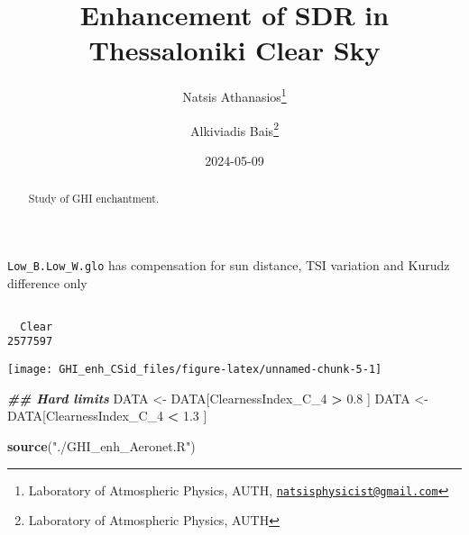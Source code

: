 \documentclass[
  10pt,
  a4paper,oneside]{article}
\title{Enhancement of SDR in Thessaloniki Clear Sky}
\author{Natsis Athanasios\footnote{Laboratory of Atmospheric Physics, AUTH, \href{mailto:natsisphysicist@gmail.com}{\nolinkurl{natsisphysicist@gmail.com}}} \and Alkiviadis Bais\footnote{Laboratory of Atmospheric Physics, AUTH}}
\date{2024-05-09}
\newenvironment{Shaded}{\begin{snugshade}}{\end{snugshade}}
\newcommand{\DocumentationTok}[1]{\textcolor[rgb]{0.56,0.35,0.01}{\textbf{\textit{#1}}}}
\newcommand{\FloatTok}[1]{\textcolor[rgb]{0.00,0.00,0.81}{#1}}
\newcommand{\FunctionTok}[1]{\textcolor[rgb]{0.13,0.29,0.53}{\textbf{#1}}}
\newcommand{\NormalTok}[1]{#1}
\newcommand{\OtherTok}[1]{\textcolor[rgb]{0.56,0.35,0.01}{#1}}
\newcommand{\SpecialCharTok}[1]{\textcolor[rgb]{0.81,0.36,0.00}{\textbf{#1}}}
\newcommand{\StringTok}[1]{\textcolor[rgb]{0.31,0.60,0.02}{#1}}
\begin{document}
\maketitle
\begin{abstract}
Study of GHI enchantment.
\end{abstract}

{
\hypersetup{linkcolor=}
\setcounter{tocdepth}{4}
\tableofcontents
}
\texttt{Low\_B.Low\_W.glo} has compensation for sun distance, TSI variation and Kurudz difference only

\begin{Shaded}
\end{Shaded}

\begin{verbatim}

  Clear 
2577597 
\end{verbatim}

\begin{Shaded}
\end{Shaded}

\begin{center}\texttt{[image: GHI\_enh\_CSid\_files/figure-latex/unnamed-chunk-5-1]} \end{center}

\begin{Shaded}
\begin{Highlighting}[]
\DocumentationTok{\#\# Hard limits}
\NormalTok{DATA }\OtherTok{\textless{}{-}}\NormalTok{ DATA[ClearnessIndex\_C\_4 }\SpecialCharTok{\textgreater{}} \FloatTok{0.8}\NormalTok{ ]}
\NormalTok{DATA }\OtherTok{\textless{}{-}}\NormalTok{ DATA[ClearnessIndex\_C\_4 }\SpecialCharTok{\textless{}} \FloatTok{1.3}\NormalTok{ ]}

\FunctionTok{source}\NormalTok{(}\StringTok{"./GHI\_enh\_Aeronet.R"}\NormalTok{)}
\end{Highlighting}
\end{Shaded}
\end{document}
